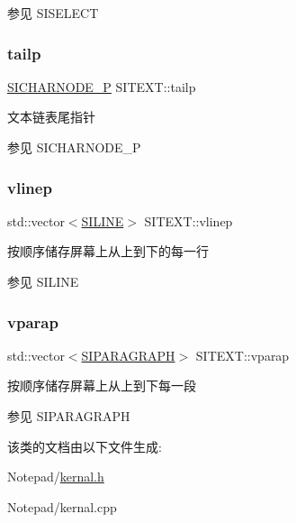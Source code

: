 \begin{DoxySeeAlso}{参见}
S\+I\+S\+E\+L\+E\+CT 
\end{DoxySeeAlso}
\mbox{\label{class_s_i_t_e_x_t_a65fc82385d60763d2f3bcca67abf99bc}} 
\subsubsection{\texorpdfstring{tailp}{tailp}}
{\footnotesize\ttfamily \hyperlink{class_s_i_c_h_a_r_n_o_d_e}{S\+I\+C\+H\+A\+R\+N\+O\+D\+E\+\_\+P} S\+I\+T\+E\+X\+T\+::tailp}



文本链表尾指针 

\begin{DoxySeeAlso}{参见}
S\+I\+C\+H\+A\+R\+N\+O\+D\+E\+\_\+P 
\end{DoxySeeAlso}
\mbox{\label{class_s_i_t_e_x_t_abdabb47ab701f95f73b806df2c440347}} 
\subsubsection{\texorpdfstring{vlinep}{vlinep}}
{\footnotesize\ttfamily std\+::vector$<$\hyperlink{struct_s_i_r_a_n_g_e}{S\+I\+L\+I\+NE}$>$ S\+I\+T\+E\+X\+T\+::vlinep}



按顺序储存屏幕上从上到下的每一行 

\begin{DoxySeeAlso}{参见}
S\+I\+L\+I\+NE 
\end{DoxySeeAlso}
\mbox{\label{class_s_i_t_e_x_t_aeeeed4da4b7633b913a7a98336a91d75}} 
\subsubsection{\texorpdfstring{vparap}{vparap}}
{\footnotesize\ttfamily std\+::vector$<$\hyperlink{struct_s_i_r_a_n_g_e}{S\+I\+P\+A\+R\+A\+G\+R\+A\+PH}$>$ S\+I\+T\+E\+X\+T\+::vparap}



按顺序储存屏幕上从上到下每一段 

\begin{DoxySeeAlso}{参见}
S\+I\+P\+A\+R\+A\+G\+R\+A\+PH 
\end{DoxySeeAlso}


该类的文档由以下文件生成\+:\begin{DoxyCompactItemize}
\item 
Notepad/\hyperlink{kernal_8h}{kernal.\+h}\item 
Notepad/kernal.\+cpp\end{DoxyCompactItemize}
